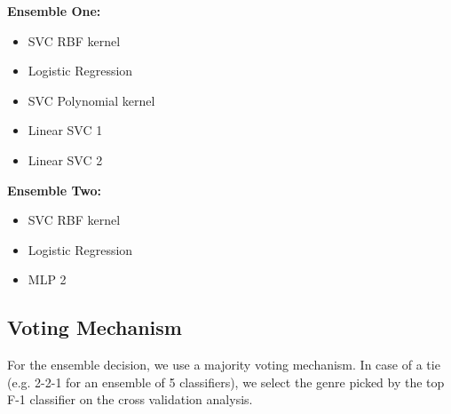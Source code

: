 \textbf{Ensemble One:}

\begin{itemize}
    \item SVC RBF kernel
    \item Logistic Regression
    \item SVC Polynomial kernel
    \item Linear SVC 1
    \item Linear SVC 2
\end{itemize}

\textbf{Ensemble Two:}

\begin{itemize}
    \item SVC RBF kernel
    \item Logistic Regression
    \item MLP 2
\end{itemize}

\subsection{Voting Mechanism}

For the ensemble decision, we use a majority voting mechanism. In case of a tie (e.g. 2-2-1 for an ensemble of 5 classifiers), we select the genre picked by the top F-1 classifier on the cross validation analysis.
